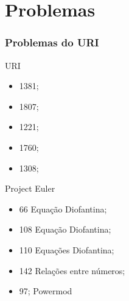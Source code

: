 \documentclass{beamer}
\begin{document}
\section{Problemas}
\begin{frame}
    \frametitle{Problemas do URI}

    \begin{minipage}{.4\textwidth}
        URI
        \begin{itemize}
            \item 1381;
            \item 1807;
            \item 1221;
            \item 1760;
            \item 1308;
        \end{itemize}
    \end{minipage}
    \begin{minipage}{.4\textwidth}
        Project Euler
        \begin{itemize}
            \item 66 Equação Diofantina;
            \item 108 Equação Diofantina;
            \item 110 Equações Diofantina;
            \item 142 Relações entre números;
            \item 97; Powermod
        \end{itemize}
    \end{minipage}
\end{frame}
\end{document}
